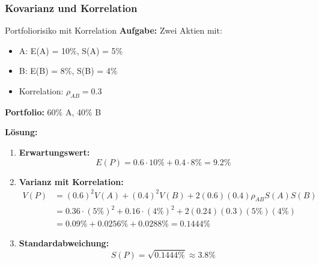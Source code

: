\subsubsection{Kovarianz und Korrelation}

\begin{example2}{Portfoliorisiko mit Korrelation}
\textbf{Aufgabe:} Zwei Aktien mit:
\begin{itemize}
\item A: E(A) = 10\%, S(A) = 5\%
\item B: E(B) = 8\%, S(B) = 4\%
\item Korrelation: $\rho_{AB} = 0.3$
\end{itemize}

\textbf{Portfolio:} 60\% A, 40\% B

\textbf{Lösung:}
\begin{enumerate}
\item \textbf{Erwartungswert:}
   $$E(P) = 0.6 \cdot 10\% + 0.4 \cdot 8\% = 9.2\%$$

\item \textbf{Varianz mit Korrelation:}
   \begin{align*}
   V(P) &= (0.6)^2V(A) + (0.4)^2V(B) + 2(0.6)(0.4)\rho_{AB}S(A)S(B) \\
   &= 0.36 \cdot (5\%)^2 + 0.16 \cdot (4\%)^2 + 2(0.24)(0.3)(5\%)(4\%) \\
   &= 0.09\% + 0.0256\% + 0.0288\% = 0.1444\%
   \end{align*}

\item \textbf{Standardabweichung:}
   $$S(P) = \sqrt{0.1444\%} \approx 3.8\%$$
\end{enumerate}
\end{example2}